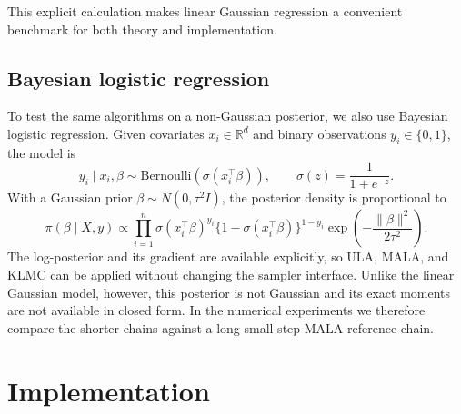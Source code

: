 \documentclass[a4paper,11pt, titlepage]{article}
\theoremstyle{definition}
\theoremstyle{plain}
\theoremstyle{remark}
\begin{document}
This explicit calculation makes linear Gaussian regression a convenient benchmark for both theory and implementation.

\subsection{Bayesian logistic regression}
\label{sec:theory-logistic-regression}

To test the same algorithms on a non-Gaussian posterior, we also use
Bayesian logistic regression. Given covariates $x_i\in\mathbb{R}^d$ and
binary observations $y_i\in\{0,1\}$, the model is
\[
y_i\mid x_i,\beta \sim \mathrm{Bernoulli}(\sigma(x_i^\top\beta)),
\qquad
\sigma(z)=\frac{1}{1+e^{-z}}.
\]
With a Gaussian prior $\beta\sim N(0,\tau^2 I)$, the posterior density is
proportional to
\[
\pi(\beta\mid X,y)
\propto
\prod_{i=1}^n
\sigma(x_i^\top\beta)^{y_i}
\{1-\sigma(x_i^\top\beta)\}^{1-y_i}
\exp\!\left(-\frac{\|\beta\|^2}{2\tau^2}\right).
\]
The log-posterior and its gradient are available explicitly, so ULA,
MALA, and KLMC can be applied without changing the sampler interface.
Unlike the linear Gaussian model, however, this posterior is not Gaussian
and its exact moments are not available in closed form. In the numerical
experiments we therefore compare the shorter chains against a long
small-step MALA reference chain.
%



\section{Implementation}
\label{sec:implementation}
\end{document}

